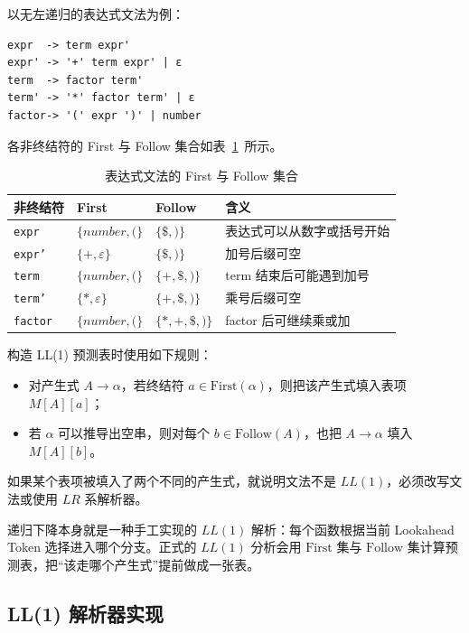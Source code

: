 以无左递归的表达式文法为例：

\begin{lstlisting}
expr  -> term expr'
expr' -> '+' term expr' | ε
term  -> factor term'
term' -> '*' factor term' | ε
factor-> '(' expr ')' | number
\end{lstlisting}

各非终结符的 First 与 Follow 集合如表~\ref{tab:first-follow}~所示。

\begin{table}[htbp]
\centering \caption{表达式文法的 First 与 Follow 集合} \label{tab:first-follow}
    \begin{tabular}{llll}
        \toprule
        非终结符 & First & Follow & 含义 \\
        \midrule
        \texttt{expr}  & $\{number, (\}$ & $\{\$, )\}$ & 表达式可以从数字或括号开始 \\
        \texttt{expr'} & $\{+, \varepsilon\}$ & $\{\$, )\}$ & 加号后缀可空 \\
        \texttt{term}  & $\{number, (\}$ & $\{+, \$, )\}$ & term 结束后可能遇到加号 \\
        \texttt{term'} & $\{*, \varepsilon\}$ & $\{+, \$, )\}$ & 乘号后缀可空 \\
        \texttt{factor}& $\{number, (\}$ & $\{*, +, \$, )\}$ & factor 后可继续乘或加 \\
        \bottomrule
    \end{tabular}
\end{table}

构造 LL(1) 预测表时使用如下规则：

\begin{itemize}
\item 对产生式 $A \rightarrow \alpha$，若终结符 $a \in \mathrm{First}(\alpha)$，则把该产生式填入表项 $M[A][a]$；
\item 若 $\alpha$ 可以推导出空串，则对每个 $b \in \mathrm{Follow}(A)$，也把 $A \rightarrow \alpha$ 填入 $M[A][b]$。
\end{itemize}

如果某个表项被填入了两个不同的产生式，就说明文法不是 $LL(1)$，必须改写文法或使用 $LR$ 系解析器。

递归下降本身就是一种手工实现的 $LL(1)$ 解析：每个函数根据当前 Lookahead Token 选择进入哪个分支。正式的 $LL(1)$ 分析会用 $\mathrm{First}$ 集与 $\mathrm{Follow}$ 集计算预测表，把“该走哪个产生式”提前做成一张表。

\subsection{LL(1) 解析器实现}

